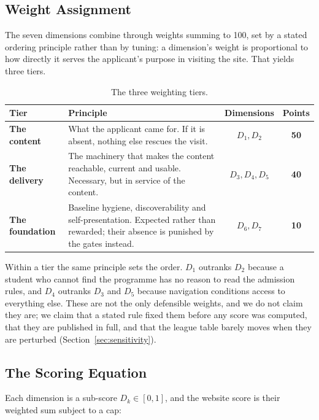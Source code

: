 \documentclass[11pt,a4paper]{article}
\begin{document}
\subsection{Weight Assignment}

The seven dimensions combine through weights summing to 100, set by a stated ordering principle
rather than by tuning: a dimension's weight is proportional to how directly it serves the applicant's
purpose in visiting the site. That yields three tiers.

\begin{table}[H]\centering\small
\caption{The three weighting tiers.}
\begin{tabular}{lp{7.9cm}cc}
\toprule
\textbf{Tier} & \textbf{Principle} & \textbf{Dimensions} & \textbf{Points} \\
\midrule
\textbf{The content}    & What the applicant came for. If it is absent, nothing else rescues the
visit. & $D_1, D_2$ & \textbf{50} \\
\textbf{The delivery}   & The machinery that makes the content reachable, current and usable.
Necessary, but in service of the content. & $D_3, D_4, D_5$ & \textbf{40} \\
\textbf{The foundation} & Baseline hygiene, discoverability and self-presentation. Expected rather
than rewarded; their absence is punished by the gates instead. & $D_6, D_7$ & \textbf{10} \\
\bottomrule
\end{tabular}
\end{table}

\noindent Within a tier the same principle sets the order. $D_1$ outranks $D_2$ because a student
who cannot find the programme has no reason to read the admission rules, and $D_4$ outranks $D_3$
and $D_5$ because navigation conditions access to everything else. These are not the only defensible
weights, and we do not claim they are; we claim that a stated rule fixed them before any score was
computed, that they are published in full, and that the league table barely moves when they are
perturbed (Section~\ref{sec:sensitivity}).

\subsection{The Scoring Equation}
\label{sec:equations}

Each dimension is a sub-score $D_k \in [0,1]$, and the website score is their weighted sum subject to
a cap:
\end{document}
